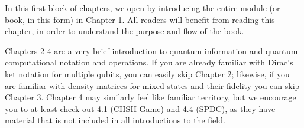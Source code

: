 
\begin{partintro}
In this first block of chapters, we open by introducing the entire module (or book, in this form) in Chapter 1.  All readers will benefit from reading this chapter, in order to understand the purpose and flow of the book.

Chapters 2-4 are a very brief introduction to quantum information and quantum computational notation and operations.  If you are already familiar with Dirac's ket notation for multiple qubits, you can easily skip Chapter 2; likewise, if you are familiar with density matrices for mixed states and their fidelity you can skip Chapter 3. Chapter 4 may similarly feel like familiar territory, but we encourage you to at least check out 4.1 (CHSH Game) and 4.4 (SPDC), as they have material that is not included in all introductions to the field.
\end{partintro}
